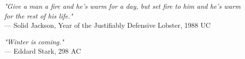 \begin{flushright}
\emph{"Give a man a fire and he's warm for a day, but set fire to him and he's warm for the rest of his life."}\\
 — Solid Jackson, Year of the Justifiably Defensive Lobster, 1988 UC
\end{flushright}

\begin{flushright}
\emph{"Winter is coming."}\\
 — Eddard Stark, 298 AC
\end{flushright}
